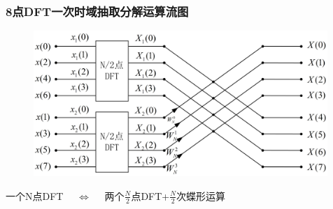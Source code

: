 \documentclass[notheorems,compress,mathserif,table]{beamer}
\begin{document}
\begin{frame}[shrink]\frametitle{8点DFT一次时域抽取分解运算流图}
\begin{figure}[h]
  \centering
  \includegraphics[width=0.99\textwidth]{8dftFirst.jpg}
\end{figure}
\par 一个N点DFT $\quad\Longleftrightarrow\quad$ 两个$\frac{N}{2}$点DFT+$\frac{N}{2}$次蝶形运算
\end{frame}
\end{document}
